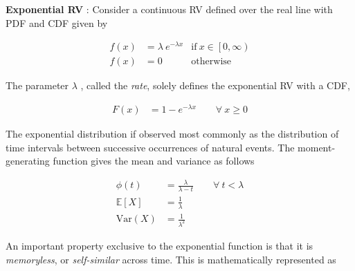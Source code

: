 \textbf{Exponential RV} :  Consider a continuous RV defined over the real line with PDF and CDF given by

\begin{align}
	f(x) &= \lambda\ e^{-\lambda x} & \text{if}\ x \in \left[0, \infty\right) \\
	f(x) &= 0 & \text{otherwise} \nonumber
\end{align}


\begin{figure}[H]
\end{figure}


The parameter $ \lambda $ , called the \textit{rate}, solely defines the exponential RV with a CDF,

\begin{align}
	F(x) &= 1 - e^{-\lambda x} \qquad \forall \ x \geq 0
\end{align}

The exponential distribution if observed most commonly as the distribution of time intervals between successive occurrences of natural events. The moment-generating function gives the mean and variance as follows

\begin{align}
	\phi(t) &= \frac{\lambda}{\lambda - t} \qquad \forall\ t < \lambda \\
	\mathbb{E}[X] &= \frac{1}{\lambda} \\
	\mathrm{Var}(X) &= \frac{1}{\lambda^2}
\end{align}

An important property exclusive to the exponential function is that it is \textit{memoryless}, or \textit{self-similar} across time. This is mathematically represented as

